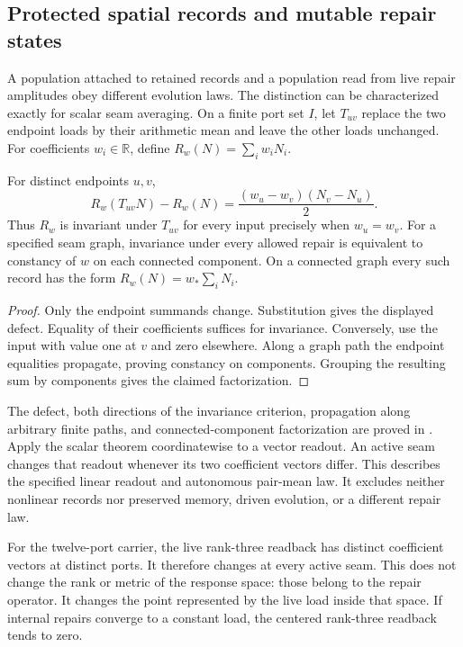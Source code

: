 \subsection{Protected spatial records and mutable repair states}
\label{sec:source-record-protection}

A population attached to retained records and a population read from live
repair amplitudes obey different evolution laws. The distinction can be
characterized exactly for scalar seam averaging. On a finite port set $I$,
let $T_{uv}$ replace the two endpoint loads by their arithmetic mean and
leave the other loads unchanged. For coefficients $w_i\in\mathbb R$, define
$R_w(N)=\sum_iw_iN_i$.

\begin{proposition}
\label{prop:source-record-protection}
For distinct endpoints $u,v$,
\[
 R_w(T_{uv}N)-R_w(N)
   =\frac{(w_u-w_v)(N_v-N_u)}2.
\]
Thus $R_w$ is invariant under $T_{uv}$ for every input precisely when
$w_u=w_v$. For a specified seam graph, invariance under every allowed
repair is equivalent to constancy of $w$ on each connected component.
On a connected graph every such record has the form
$R_w(N)=w_*\sum_iN_i$.
\end{proposition}
\begin{proof}
Only the endpoint summands change. Substitution gives the displayed defect.
Equality of their coefficients suffices for invariance. Conversely, use the
input with value one at $v$ and zero elsewhere. Along a graph path the
endpoint equalities propagate, proving constancy on components. Grouping
the resulting sum by components gives the claimed factorization.
\end{proof}

The defect, both directions of the invariance criterion, propagation along
arbitrary finite paths, and connected-component factorization are proved in
. Apply the scalar theorem
coordinatewise to a vector readout. An active seam changes that readout
whenever its two coefficient vectors differ. This describes the specified
linear readout and autonomous pair-mean law. It excludes neither nonlinear
records nor preserved memory, driven evolution, or a different repair law.

For the twelve-port carrier, the live rank-three readback has distinct
coefficient vectors at distinct ports. It therefore changes at every active
seam. This does not change the rank or metric of the response space: those
belong to the repair operator. It changes the point represented by the live
load inside that space. If internal repairs converge to a constant load,
the centered rank-three readback tends to zero.

